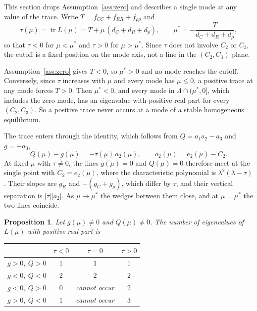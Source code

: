 \documentclass[11pt]{article}
\newtheorem{proposition}{Proposition}
\theoremstyle{definition}
\theoremstyle{remark}
\begin{document}
This section drops Assumption~\ref{ass:zero} and describes a single mode at any value of the trace. Write $T=f_{CC}+f_{RR}+f_{\rho\rho}$ and
\[
\tau(\mu)=\operatorname{tr}L(\mu)=T+\mu\,(d_C+d_R+d_\rho),
\qquad
\mu^*=-\frac{T}{d_C+d_R+d_\rho},
\]
so that $\tau<0$ for $\mu<\mu^*$ and $\tau>0$ for $\mu>\mu^*$. Since $\tau$ does not involve $C_2$ or $C_3$, the cutoff is a fixed position on the mode axis, not a line in the $(C_2,C_3)$ plane.

Assumption~\ref{ass:zero} gives $T<0$, so $\mu^*>0$ and no mode reaches the cutoff. Conversely, since $\tau$ increases with $\mu$ and every mode has $\mu\le0$, a positive trace at any mode forces $T>0$. Then $\mu^*<0$, and every mode in $\Lambda\cap(\mu^*,0]$, which includes the zero mode, has an eigenvalue with positive real part for every $(C_2,C_3)$. So a positive trace never occurs at a mode of a stable homogeneous equilibrium.

The trace enters through the identity, which follows from $Q=a_1a_2-a_3$ and $g=-a_3$,
\begin{equation}
Q(\mu)-g(\mu)=-\tau(\mu)\,a_2(\mu),\qquad a_2(\mu)=e_2(\mu)-C_2. \label{eq:Q-g-trace}
\end{equation}
At fixed $\mu$ with $\tau\neq0$, the lines $g(\mu)=0$ and $Q(\mu)=0$ therefore meet at the single point with $C_2=e_2(\mu)$, where the characteristic polynomial is $\lambda^2(\lambda-\tau)$. Their slopes are $g_R$ and $-(g_C+g_\rho)$, which differ by $\tau$, and their vertical separation is $|\tau||a_2|$. As $\mu\to\mu^*$ the wedges between them close, and at $\mu=\mu^*$ the two lines coincide.

\begin{proposition}\label{prop:trace-count}
Let $g(\mu)\neq0$ and $Q(\mu)\neq0$. The number of eigenvalues of $L(\mu)$ with positive real part is
\begin{center}
\renewcommand{\arraystretch}{1.25}
\begin{tabular}{|c|c|c|c|}
\hline
 & $\tau<0$ & $\tau=0$ & $\tau>0$ \\
\hline
$g>0,\ Q>0$ & $1$ & $1$ & $1$ \\
\hline
$g<0,\ Q<0$ & $2$ & $2$ & $2$ \\
\hline
$g<0,\ Q>0$ & $0$ & cannot occur & $2$ \\
\hline
$g>0,\ Q<0$ & $1$ & cannot occur & $3$ \\
\hline
\end{tabular}
\end{center}
\end{proposition}
\end{document}
